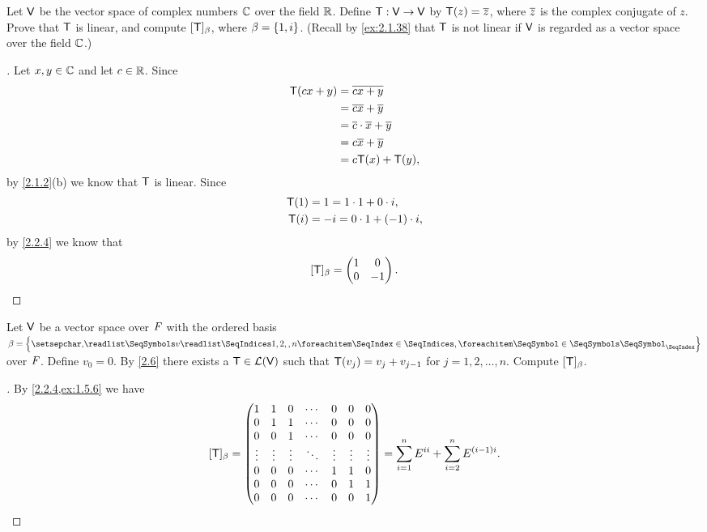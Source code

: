 \begin{ex}\label{ex:2.2.9}
	Let \(\mathsf{V}\) be the vector space of complex numbers \(\mathbb{C}\) over the field \(\mathbb{R}\).
	Define \(\mathsf{T} : \mathsf{V} \to \mathsf{V}\) by \(\mathsf{T}(z) = \overline{z}\), where \(\overline{z}\) is the complex conjugate of \(z\).
	Prove that \(\mathsf{T}\) is linear, and compute \([\mathsf{T}]_{\beta}\), where \(\beta = \left\lbrace1, i\right\rbrace\).
	(Recall by \cref{ex:2.1.38} that \(\mathsf{T}\) is not linear if \(\mathsf{V}\) is regarded as a vector space over the field \(\mathbb{C}\).)
\end{ex}

\begin{proof}[]
	Let \(x, y \in \mathbb{C}\) and let \(c \in \mathbb{R}\).
	Since
	\begin{align*}
		\mathsf{T}(cx + y) & = \overline{cx + y}                      \\
		           & = \overline{cx} + \overline{y}               \\
		           & = \overline{c} \cdot \overline{x} + \overline{y} \\
		           & = c \overline{x} + \overline{y}              \\
		           & = c \mathsf{T}(x) + \mathsf{T}(y),
	\end{align*}
	by \cref{2.1.2}(b) we know that \(\mathsf{T}\) is linear.
	Since
	\begin{align*}
		\mathsf{T}(1) & = 1 = 1 \cdot 1 + 0 \cdot i,     \\
		\mathsf{T}(i) & = -i = 0 \cdot 1 + (-1) \cdot i,
	\end{align*}
	by \cref{2.2.4} we know that
	\[
		[\mathsf{T}]_{\beta} = \begin{pmatrix}
			1 & 0  \\
			0 & -1
		\end{pmatrix}.
	\]
\end{proof}

\begin{ex}\label{ex:2.2.10}
	Let \(\mathsf{V}\) be a vector space over \(\mathit{F}\) with the ordered basis \(\beta = \set{\seq{v}{1,2,,n}}\) over \(\mathit{F}\).
	Define \(v_0 = 0\).
	By \cref{2.6} there exists a \(\mathsf{T} \in \mathcal{L}(\mathsf{V})\) such that \(\mathsf{T}(v_j) = v_j + v_{j - 1}\) for \(j = 1, 2, \dots, n\).
	Compute \([\mathsf{T}]_{\beta}\).
\end{ex}

\begin{proof}[]
	By \cref{2.2.4,ex:1.5.6} we have
	\[
		[\mathsf{T}]_{\beta} = \begin{pmatrix}
			1      & 1      & 0      & \cdots & 0      & 0      & 0      \\
			0      & 1      & 1      & \cdots & 0      & 0      & 0      \\
			0      & 0      & 1      & \cdots & 0      & 0      & 0      \\
			\vdots & \vdots & \vdots & \ddots & \vdots & \vdots & \vdots \\
			0      & 0      & 0      & \cdots & 1      & 1      & 0      \\
			0      & 0      & 0      & \cdots & 0      & 1      & 1      \\
			0      & 0      & 0      & \cdots & 0      & 0      & 1
		\end{pmatrix} = \sum_{i = 1}^n E^{i i} + \sum_{i = 2}^n E^{(i - 1) i}.
	\]
\end{proof}

